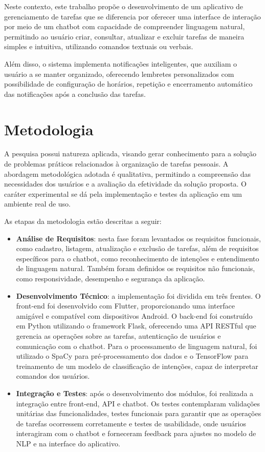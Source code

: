\documentclass[a4paper,12pt]{article}
\begin{document}
Neste contexto, este trabalho propõe o desenvolvimento de um aplicativo de gerenciamento de tarefas que se diferencia por oferecer uma interface de interação por meio de um chatbot com capacidade de compreender linguagem natural, permitindo ao usuário criar, consultar, atualizar e excluir tarefas de maneira simples e intuitiva, utilizando comandos textuais ou verbais.

Além disso, o sistema implementa notificações inteligentes, que auxiliam o usuário a se manter organizado, oferecendo lembretes personalizados com possibilidade de configuração de horários, repetição e encerramento automático das notificações após a conclusão das tarefas.

\section{Metodologia}

A pesquisa possui natureza aplicada, visando gerar conhecimento para a solução de problemas práticos relacionados à organização de tarefas pessoais. A abordagem metodológica adotada é qualitativa, permitindo a compreensão das necessidades dos usuários e a avaliação da efetividade da solução proposta. O caráter experimental se dá pela implementação e testes da aplicação em um ambiente real de uso.

As etapas da metodologia estão descritas a seguir:

\begin{itemize}
    \item \textbf{Análise de Requisitos}: nesta fase foram levantados os requisitos funcionais, como cadastro, listagem, atualização e exclusão de tarefas, além de requisitos específicos para o chatbot, como reconhecimento de intenções e entendimento de linguagem natural. Também foram definidos os requisitos não funcionais, como responsividade, desempenho e segurança da aplicação.
    
    \item \textbf{Desenvolvimento Técnico}: a implementação foi dividida em três frentes. O front-end foi desenvolvido com Flutter, proporcionando uma interface amigável e compatível com dispositivos Android. O back-end foi construído em Python utilizando o framework Flask, oferecendo uma API RESTful que gerencia as operações sobre as tarefas, autenticação de usuários e comunicação com o chatbot. Para o processamento de linguagem natural, foi utilizado o SpaCy para pré-processamento dos dados e o TensorFlow para treinamento de um modelo de classificação de intenções, capaz de interpretar comandos dos usuários.
    
    \item \textbf{Integração e Testes}: após o desenvolvimento dos módulos, foi realizada a integração entre front-end, API e chatbot. Os testes contemplaram validações unitárias das funcionalidades, testes funcionais para garantir que as operações de tarefas ocorressem corretamente e testes de usabilidade, onde usuários interagiram com o chatbot e forneceram feedback para ajustes no modelo de NLP e na interface do aplicativo.
\end{itemize}
\end{document}
